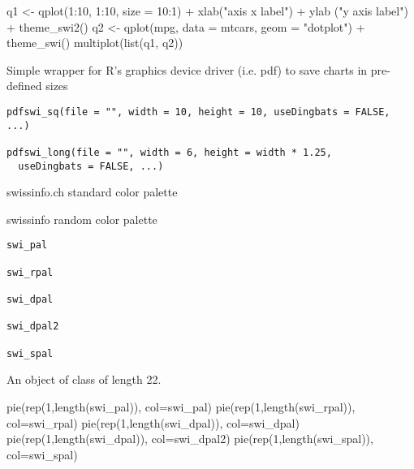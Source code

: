 \documentclass[a4paper]{book}
\begin{document}
%
\begin{Examples}
\begin{ExampleCode}
q1 <- qplot(1:10, 1:10, size = 10:1) + xlab("axis x label") + ylab ("y axis label") + theme_swi2()
q2 <- qplot(mpg, data = mtcars, geom = "dotplot") + theme_swi()
multiplot(list(q1, q2))
\end{ExampleCode}
\end{Examples}
%
\begin{Description}\relax
Simple wrapper for R's graphics device driver (i.e. pdf) to save charts in pre-defined sizes
\end{Description}
%
\begin{Usage}
\begin{verbatim}
pdfswi_sq(file = "", width = 10, height = 10, useDingbats = FALSE, ...)

pdfswi_long(file = "", width = 6, height = width * 1.25,
  useDingbats = FALSE, ...)
\end{verbatim}
\end{Usage}
%
\begin{Description}\relax
swissinfo.ch standard color palette

swissinfo random color palette
\end{Description}
%
\begin{Usage}
\begin{verbatim}
swi_pal

swi_rpal

swi_dpal

swi_dpal2

swi_spal
\end{verbatim}
\end{Usage}
%
\begin{Format}
An object of class  of length 22.
\end{Format}
%
\begin{Examples}
\begin{ExampleCode}
pie(rep(1,length(swi_pal)), col=swi_pal)
pie(rep(1,length(swi_rpal)), col=swi_rpal)
pie(rep(1,length(swi_dpal)), col=swi_dpal)
pie(rep(1,length(swi_dpal)), col=swi_dpal2)
pie(rep(1,length(swi_spal)), col=swi_spal)
\end{ExampleCode}
\end{Examples}
\end{document}

